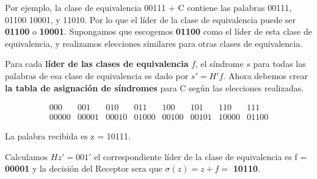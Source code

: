 \documentclass{beamer}
\theoremstyle{plain}
\theoremstyle{example}
\theoremstyle{example}
\begin{document}
\begin{frame}  \footnotesize  

Por ejemplo,  la clase de equivalencia 00111 + C contiene las palabras 00111, 01100 10001, y 11010. Por lo que el líder de la clase de equivalencia puede ser  \textbf{01100} o \textbf{10001}. Supongamos que escogemos \textbf{01100} como el líder de esta clase de equivalencia, y realizamos elecciones similares para otras clases de equivalencia. \\

\vspace*{13pt}

Para cada \textbf{líder de las clases de equivalencia} $f$, el síndrome $s$  para todas las palabras de esa clase de equivalencia es dado por $s' = H' f$. Ahora debemos crear \textbf{la tabla de asignación de síndromes} para C según las elecciones realizadas.

\[
    \begin{array}{cccccccc}
               000	& 001	& 010	& 011&	100	&101	&110	&111\\
00000 & 00001& 00010 & 01000 & 00100 & 00101 & 10000& 01100
           			\end{array}  		
\]

\vspace*{0.3cm}

La palabra recibida es z = 10111. \\

\vspace*{0.3cm}

Calculamos $Hz' = 001'$ el correspondiente líder de la clase de equivalencia es f = \textbf{00001} y la decisión del Receptor sera que $\sigma(z) = z + f = $ \textbf{10110}.


\end{frame} 
\end{document}
